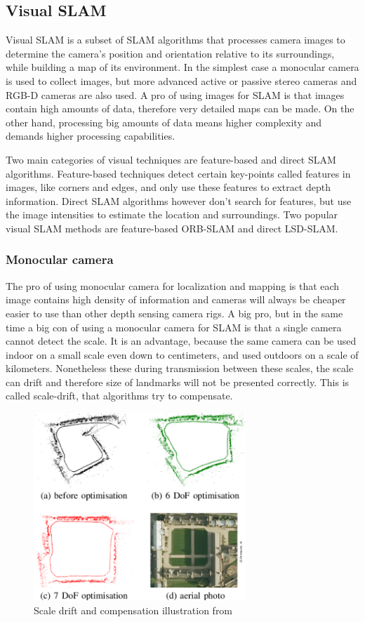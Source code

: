 \subsection{Visual SLAM}
Visual SLAM is a subset of SLAM algorithms that processes camera images to determine the camera's position and orientation
relative to its surroundings, while building a map of its environment. In the simplest case a monocular camera is used
to collect images, but more advanced active or passive stereo cameras and RGB-D cameras are also used. A pro of using
images for SLAM is that images contain high amounts of data, therefore very detailed maps can be made. On the other hand,
processing big amounts of data means higher complexity and demands higher processing capabilities.


Two main categories of visual techniques are feature-based and direct SLAM algorithms. Feature-based techniques detect
certain key-points called features in images, like corners and edges, and only use these features to extract depth information.
Direct SLAM algorithms however don't search for features, but use the image intensities to estimate the location and surroundings.
Two popular visual SLAM methods are feature-based ORB-SLAM and direct LSD-SLAM.

\subsubsection{Monocular camera}
The pro of using monocular camera for localization and mapping is that each image contains high density of information and
cameras will always be cheaper easier to use than other depth sensing camera rigs. 
A big pro, but in the same time a big con of using a monocular camera for SLAM is that a single camera cannot detect the scale.
It is an advantage, because the same camera can be used indoor on a small scale even down to centimeters, and used outdoors on
a scale of kilometers. Nonetheless these during transmission between these scales, the scale can drift and therefore size of
landmarks will not be presented correctly. This is called scale-drift, that algorithms try to compensate.

\begin{figure}[!ht]
    \centering
	\includegraphics[width=80mm, keepaspectratio]{figures/scale_drift_lsd_slam.png}
    \caption{Scale drift and compensation illustration from \cite{Strasdat2010ScaleDL}}
    \label{fig:scale_drift_lsd_slam}
\end{figure}


